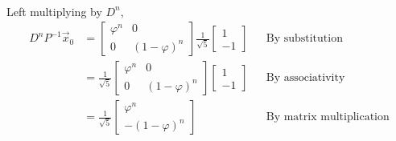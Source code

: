 \documentclass{article}
\newcommand{\reason}[1]{&& \text{#1}}
\begin{document}
\begin{enumerate}
\begin{align*}
        \end{align*}
        Left multiplying by $D^n$,
        \begin{align*}
          D^{n}P^{-1}\vec{x}_0 & = \begin{bmatrix}
                                     \varphi^n & 0             \\
                                     0         & (1-\varphi)^n
                                   \end{bmatrix}\frac{1}{\sqrt{5}}\begin{bmatrix}
                                                                    1 \\
                                                                    -1
                                                                  \end{bmatrix} \reason{By substitution}  \\[1ex]
                               & = \frac{1}{\sqrt{5}}\begin{bmatrix}
                                                       \varphi^n & 0             \\
                                                       0         & (1-\varphi)^n
                                                     \end{bmatrix}\begin{bmatrix}
                                                                    1 \\
                                                                    -1
                                                                  \end{bmatrix} \reason{By associativity} \\[1ex]
                               & = \frac{1}{\sqrt{5}}\begin{bmatrix}
                                                       \varphi^n \\
                                                       -(1-\varphi)^n
                                                     \end{bmatrix} \reason{By matrix multiplication}
        \end{align*}


\end{enumerate}
\end{document}
